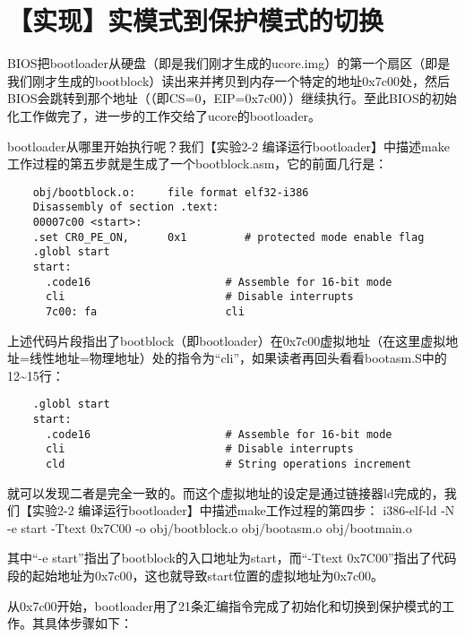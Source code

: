 \section{【实现】实模式到保护模式的切换}\label{ux5b9eux73b0ux5b9eux6a21ux5f0fux5230ux4fddux62a4ux6a21ux5f0fux7684ux5207ux6362}

BIOS把bootloader从硬盘（即是我们刚才生成的ucore.img）的第一个扇区（即是我们刚才生成的bootblock）读出来并拷贝到内存一个特定的地址0x7c00处，然后BIOS会跳转到那个地址（（即CS=0，EIP=0x7c00））继续执行。至此BIOS的初始化工作做完了，进一步的工作交给了ucore的bootloader。

bootloader从哪里开始执行呢？我们【实验2-2
编译运行bootloader】中描述make工作过程的第五步就是生成了一个bootblock.asm，它的前面几行是：

\begin{lstlisting}
    obj/bootblock.o:     file format elf32-i386
    Disassembly of section .text:
    00007c00 <start>:
    .set CR0_PE_ON,      0x1         # protected mode enable flag
    .globl start
    start:
      .code16                     # Assemble for 16-bit mode
      cli                         # Disable interrupts
      7c00: fa                    cli
\end{lstlisting}

上述代码片段指出了bootblock（即bootloader）在0x7c00虚拟地址（在这里虚拟地址=线性地址=物理地址）处的指令为``cli''，如果读者再回头看看bootasm.S中的12\textasciitilde{}15行：

\begin{lstlisting}
    .globl start
    start:
      .code16                     # Assemble for 16-bit mode
      cli                         # Disable interrupts
      cld                         # String operations increment
\end{lstlisting}

就可以发现二者是完全一致的。而这个虚拟地址的设定是通过链接器ld完成的，我们【实验2-2
编译运行bootloader】中描述make工作过程的第四步： i386-elf-ld -N -e start
-Ttext 0x7C00 -o obj/bootblock.o obj/bootasm.o obj/bootmain.o

其中``-e start''指出了bootblock的入口地址为start，而``-Ttext
0x7C00''指出了代码段的起始地址为0x7c00，这也就导致start位置的虚拟地址为0x7c00。

从0x7c00开始，bootloader用了21条汇编指令完成了初始化和切换到保护模式的工作。其具体步骤如下：

